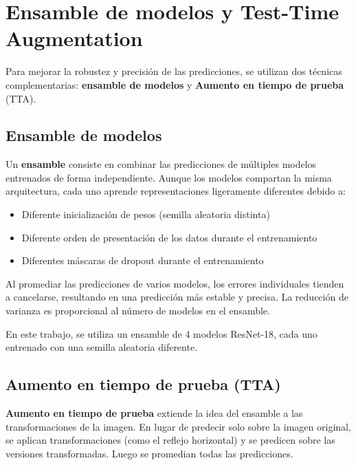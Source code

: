 \section{Ensamble de modelos y Test-Time Augmentation}
\label{sec:ensemble_tta}

Para mejorar la robustez y precisión de las predicciones, se utilizan dos técnicas complementarias: \textbf{ensamble de modelos} y \textbf{Aumento en tiempo de prueba} (TTA).

\subsection{Ensamble de modelos}

Un \textbf{ensamble} consiste en combinar las predicciones de múltiples modelos entrenados de forma independiente. Aunque los modelos compartan la misma arquitectura, cada uno aprende representaciones ligeramente diferentes debido a:
\begin{itemize}
    \item Diferente inicialización de pesos (semilla aleatoria distinta)
    \item Diferente orden de presentación de los datos durante el entrenamiento
    \item Diferentes máscaras de dropout durante el entrenamiento
\end{itemize}

Al promediar las predicciones de varios modelos, los errores individuales tienden a cancelarse, resultando en una predicción más estable y precisa. La reducción de varianza es proporcional al número de modelos en el ensamble.

En este trabajo, se utiliza un ensamble de 4 modelos ResNet-18, cada uno entrenado con una semilla aleatoria diferente.

\subsection{Aumento en tiempo de prueba (TTA)}

\textbf{Aumento en tiempo de prueba} extiende la idea del ensamble a las transformaciones de la imagen. En lugar de predecir solo sobre la imagen original, se aplican transformaciones (como el reflejo horizontal) y se predicen sobre las versiones transformadas. Luego se promedian todas las predicciones.

